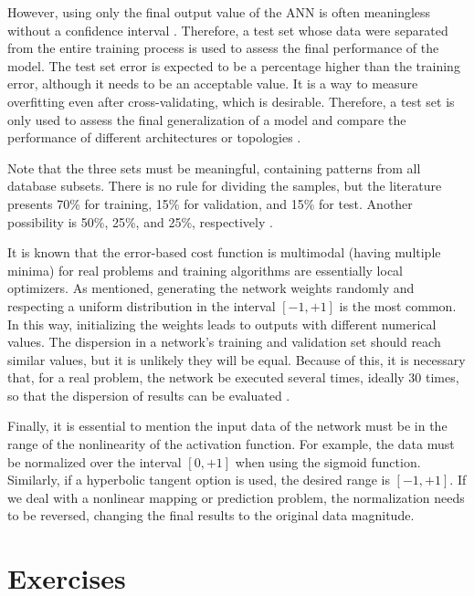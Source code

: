 However, using only the final output value of the ANN is often meaningless without a confidence interval \cite{Kohavi1995}. Therefore, a test set whose data were separated from the entire training process is used to assess the final performance of the model. The test set error is expected to be a percentage higher than the training error, although it needs to be an acceptable value. It is a way to measure overfitting even after cross-validating, which is desirable. Therefore, a test set is only used to assess the final generalization of a model and compare the performance of different architectures or topologies \cite{Ripley2005}.

Note that the three sets must be meaningful, containing patterns from all database subsets. There is no rule for dividing the samples, but the literature presents 70\% for training, 15\% for validation, and 15\% for test. Another possibility is 50\%, 25\%, and 25\%, respectively \cite{haykin}.

It is known that the error-based cost function is multimodal (having multiple minima) for real problems and training algorithms are essentially local optimizers. As mentioned, generating the network weights randomly and respecting a uniform distribution in the interval $[-1,+1]$ is the most common. In this way, initializing the weights leads to outputs with different numerical values. The dispersion in a network's training and validation set should reach similar values, but it is unlikely they will be equal. Because of this, it is necessary that, for a real problem, the network be executed several times, ideally 30 times, so that the dispersion of results can be evaluated \cite{demvsar2006statistical}. 

Finally, it is essential to mention the input data of the network must be in the range of the nonlinearity of the activation function. For example, the data must be normalized over the interval $[0,+1]$ when using the sigmoid function. Similarly, if a hyperbolic tangent option is used, the desired range is $[-1,+1]$. If we deal with a nonlinear mapping or prediction problem, the normalization needs to be reversed, changing the final results to the original data magnitude.

\section{Exercises}
\label{ssec:exercises}

